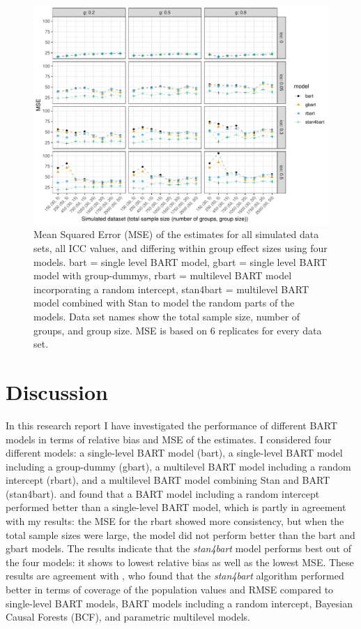 \documentclass[10pt, a4paper, titlepage]{article}
\begin{document}
\begin{figure}[H]
\caption{Mean Squared Error (MSE) of the estimates for all simulated data sets, all ICC values, and differing within group effect sizes using four models. bart = single level BART model, gbart = single level BART model with group-dummys, rbart = multilevel BART model incorporating a random intercept, stan4bart = multilevel BART model combined with Stan to model the random parts of the models. Data set names show the total sample size, number of groups, and group size. MSE is based on 6 replicates for every data set.}
\centering
\label{fig:mseplots}
\includegraphics[width=\textwidth]{mseplots4.pdf}
\end{figure}

\newpage
\section{Discussion}

In this research report I have investigated the performance of different BART models in terms of relative bias and MSE of the estimates. I considered four different models: a single-level BART model (bart), a single-level BART model including a group-dummy (gbart), a multilevel BART model including a random intercept (rbart), and a multilevel BART model combining Stan and BART (stan4bart). \citet{chen2020, tan2016} and \citet{wundervald2022} found that a BART model including a random intercept performed better than a single-level BART model, which is partly in agreement with my results: the MSE for the rbart showed more consistency, but when the total sample sizes were large, the model did not perform better than the bart and gbart models. The results indicate that the \textit{stan4bart} model performs best out of the four models: it shows to lowest relative bias as well as the lowest MSE. These results are agreement with \citet{dorie2022}, who found that the \textit{stan4bart} algorithm performed better in terms of coverage of the population values and RMSE compared to single-level BART models, BART models including a random intercept, Bayesian Causal Forests (BCF), and parametric multilevel models.
\end{document}
